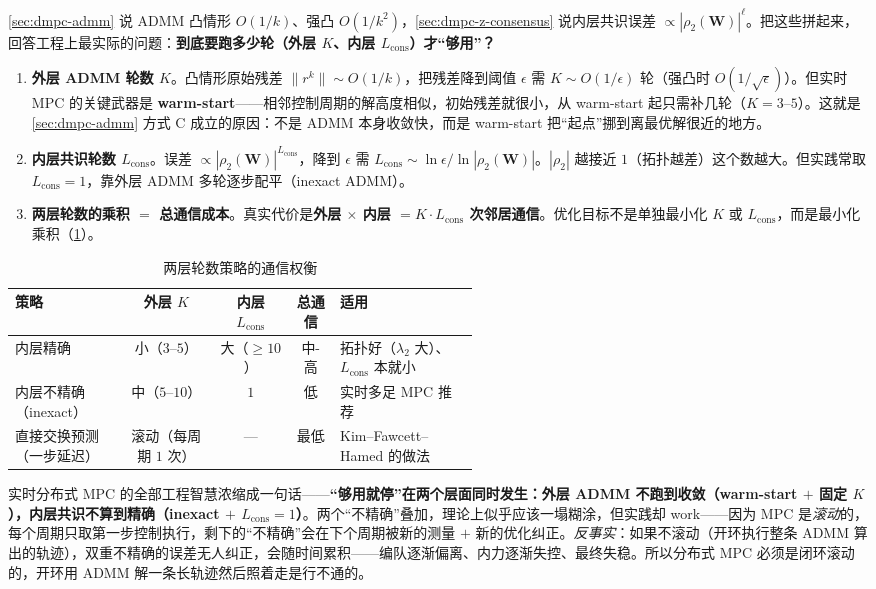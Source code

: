 \cref{sec:dmpc-admm} 说 ADMM 凸情形 $O(1/k)$、强凸 $O(1/k^2)$，\cref{sec:dmpc-z-consensus} 说内层共识误差 $\propto|\rho_2(\mathbf{W})|^\ell$。把这些拼起来，回答工程上最实际的问题：\textbf{到底要跑多少轮（外层 $K$、内层 $L_{\text{cons}}$）才“够用”？}
\begin{enumerate}
  \item \textbf{外层 ADMM 轮数 $K$}。凸情形原始残差 $\|r^k\|\sim O(1/k)$，把残差降到阈值 $\epsilon$ 需 $K\sim O(1/\epsilon)$ 轮（强凸时 $O(1/\sqrt\epsilon)$）。但实时 MPC 的关键武器是 \textbf{warm-start}——相邻控制周期的解高度相似，初始残差就很小，从 warm-start 起只需补几轮（$K=3$–$5$）。这就是 \cref{sec:dmpc-admm} 方式 C 成立的原因：不是 ADMM 本身收敛快，而是 warm-start 把“起点”挪到离最优解很近的地方。
  \item \textbf{内层共识轮数 $L_{\text{cons}}$}。误差 $\propto|\rho_2(\mathbf{W})|^{L_{\text{cons}}}$，降到 $\epsilon$ 需 $L_{\text{cons}}\sim\ln\epsilon/\ln|\rho_2(\mathbf{W})|$。$|\rho_2|$ 越接近 $1$（拓扑越差）这个数越大。但实践常取 $L_{\text{cons}}=1$，靠外层 ADMM 多轮逐步配平（inexact ADMM）。
  \item \textbf{两层轮数的乘积 $=$ 总通信成本}。真实代价是\textbf{外层 $\times$ 内层 $=K\cdot L_{\text{cons}}$ 次邻居通信}。优化目标不是单独最小化 $K$ 或 $L_{\text{cons}}$，而是最小化乘积（\cref{tab:dmpc-rounds}）。
\end{enumerate}

\begin{table}[H]\centering\small
\caption{两层轮数策略的通信权衡}
\label{tab:dmpc-rounds}
\begin{tabular}{p{0.24\linewidth}cccp{0.30\linewidth}}
\toprule
策略 & 外层 $K$ & 内层 $L_{\text{cons}}$ & 总通信 & 适用 \\
\midrule
内层精确 & 小（$3$–$5$） & 大（$\ge10$） & 中-高 & 拓扑好（$\lambda_2$ 大）、$L_{\text{cons}}$ 本就小 \\
内层不精确（inexact） & 中（$5$–$10$） & $1$ & 低 & 实时多足 MPC 推荐 \\
直接交换预测（一步延迟） & 滚动（每周期 $1$ 次） & — & 最低 & Kim--Fawcett--Hamed\cite{kim2023layered} 的做法 \\
\bottomrule
\end{tabular}
\end{table}

\begin{insight}\label{ins:dmpc-rolling}
实时分布式 MPC 的全部工程智慧浓缩成一句话——\textbf{“够用就停”在两个层面同时发生：外层 ADMM 不跑到收敛（warm-start $+$ 固定 $K$），内层共识不算到精确（inexact $+$ $L_{\text{cons}}=1$）}。两个“不精确”叠加，理论上似乎应该一塌糊涂，但实践却 work——因为 MPC 是\emph{滚动}的，每个周期只取第一步控制执行，剩下的“不精确”会在下个周期被新的测量 $+$ 新的优化纠正。\emph{反事实}：如果不滚动（开环执行整条 ADMM 算出的轨迹），双重不精确的误差无人纠正，会随时间累积——编队逐渐偏离、内力逐渐失控、最终失稳。所以分布式 MPC 必须是闭环滚动的，开环用 ADMM 解一条长轨迹然后照着走是行不通的。
\end{insight}

